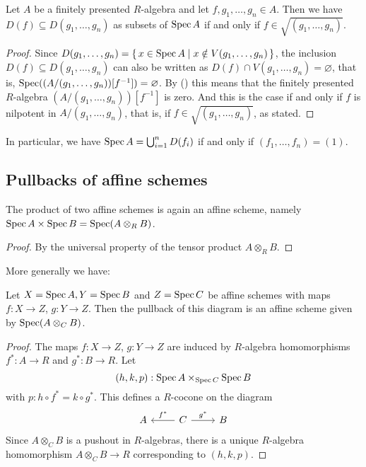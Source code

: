 \begin{lemma}%
  Let $A$ be a finitely presented $R$-algebra
  and let $f, g_1, \dots, g_n \in A$.
  Then we have $D(f) \subseteq D(g_1, \dots, g_n)$
  as subsets of $\operatorname{Spec} A$
  if and only if $f \in \sqrt{(g_1, \dots, g_n)}$.
\end{lemma}

\begin{proof}
  Since $D(g_1, \dots, g_n) = \{\, x \in \operatorname{Spec} A \mid x \notin V(g_1, \dots, g_n) \,\}$,
  the inclusion $D(f) \subseteq D(g_1, \dots, g_n)$
  can also be written as
  $D(f) \cap V(g_1, \dots, g_n) = \varnothing$,  that is,
  $\operatorname{Spec}((A/(g_1, \dots, g_n))[f^{-1}]) = \varnothing$.
  By ()
  this means that the finitely presented $R$-algebra $(A/(g_1, \dots, g_n))[f^{-1}]$
  is zero.
  And this is the case if and only if $f$ is nilpotent in $A/(g_1, \dots, g_n)$,
  that is, if $f \in \sqrt{(g_1, \dots, g_n)}$, as stated.
\end{proof}

In particular,
we have $\operatorname{Spec} A = \bigcup_{i = 1}^n D(f_i)$
if and only if $(f_1, \dots, f_n) = (1)$.

\subsection{Pullbacks of affine schemes}

\begin{lemma}%
  \label{affine-product}
  The product of two affine schemes is again an affine scheme,
  namely
  $\operatorname{Spec} A \times \operatorname{Spec} B = \operatorname{Spec} (A \otimes_R B)$.
\end{lemma}

\begin{proof}
  By the universal property of the tensor product $A \otimes_R B$.
\end{proof}

More generally we have:

\begin{lemma}%
  \label{affine-fiber-product}
  Let $X=\operatorname{Spec} A,Y=\operatorname{Spec} B$ and $Z=\operatorname{Spec} C$ be affine schemes
  with maps $f:X\to Z$, $g:Y\to Z$.
  Then the pullback of this diagram is an affine scheme given by $\operatorname{Spec} (A\otimes_C B)$.
\end{lemma}

\begin{proof}
  The maps $f:X\to Z$, $g:Y\to Z$ are induced by $R$-algebra homomorphisms $f^*:A\to R$ and $g^*:B\to R$.
  Let
  \[ (h,k,p) : \operatorname{Spec} A \times_{\operatorname{Spec} C} \operatorname{Spec} B \]
  with $p:h\circ f^*=k\circ g^* $.
  This defines a $R$-cocone on the diagram
  \[
    \begin{tikzcd}
      A & C\ar[r,"g^*"]\ar[l,"f^*",swap] & B
    \end{tikzcd}
  \]
  Since $A\otimes_C B$ is a pushout in $R$-algebras,
  there is a unique $R$-algebra homomorphism $A\otimes_C B \to R$ corresponding to $(h,k,p)$.
\end{proof}

